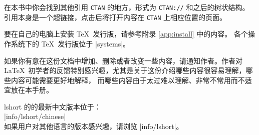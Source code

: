 在本书中你会找到其他引用 \texttt{CTAN} 的地方，形式为 \texttt{CTAN://} 和之后的树状结构。
引用本身是一个超链接，点击后将打开内容在 \texttt{CTAN} 上相应位置的页面。

要在自己的电脑上安装 \TeX\ 发行版，请参考附录 \ref{app:install} 中的内容。
各个操作系统下的 \TeX\ 发行版位于 \CTAN|systems|。

\bigskip
如果你有意在这份文档中增加、删除或者改变一些内容，请通知作者。作者对 \LaTeX\ 
初学者的反馈特别感兴趣，尤其是关于这份介绍哪些内容很容易理解，哪些内容可能需要更好地解释，
而哪些内容由于太过难以理解、非常不常用而不适宜放在本手册。

\bigskip
\begin{flushright}
\end{flushright}


\noindent lshort 的的最新中文版本位于：\\
\CTAN|info/lshort/chinese|\\%
如果用户对其他语言的版本感兴趣，请浏览 \CTAN|info/lshort|。

\smallskip

\endinput
